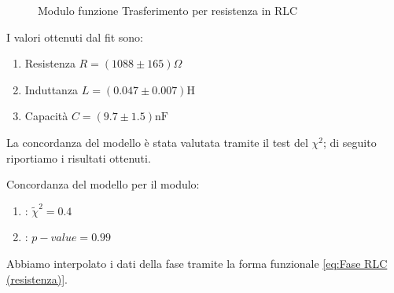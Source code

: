 \documentclass[letterpaper,12pt]{article}
\begin{document}
\begin{figure}[h!]
    \centering
    \caption{Modulo funzione Trasferimento per resistenza in RLC}
    \label{fig:RLC_R_modulo}
\end{figure}
I valori ottenuti dal fit sono:
\begin{enumerate}
    \item Resistenza  $R = (1088\pm165) \Omega $
    \item Induttanza  $L = (0.047\pm0.007) \text{H} $
    \item Capacità    $C = (9.7\pm1.5) \text{nF} $
\end{enumerate}
La concordanza del modello è stata valutata tramite il test del $\chi^2$; di seguito riportiamo i risultati ottenuti.

Concordanza del modello per il modulo:
\begin{enumerate} 
    \item: $\widetilde{\chi}^2 = 0.4$   
    \item: $p-value = 0.99$ 
\end{enumerate}

Abbiamo interpolato i dati della fase tramite la forma funzionale \ref{eq:Fase RLC (resistenza)}.
\end{document}
